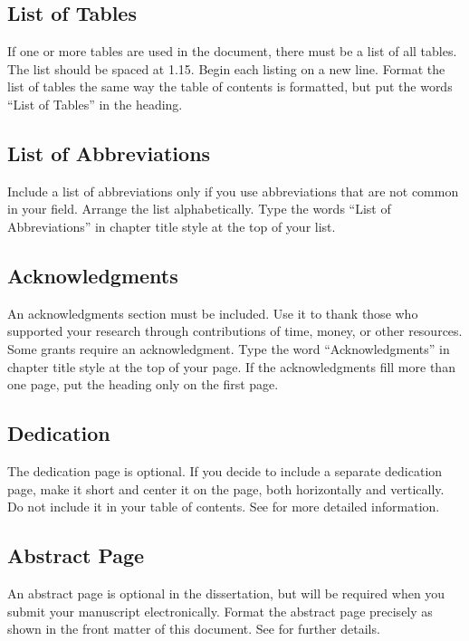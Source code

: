 \subsection{List of Tables}

If one or more tables are used in the document, there must be a list of all tables.
The list should be spaced at 1.15.
Begin each listing on a new line.
Format the list of tables the same way the table of contents is formatted, but put the words ``List of Tables'' in the heading.

\subsection{List of Abbreviations}

Include a list of abbreviations only if you use abbreviations that are not common in your field.
Arrange the list alphabetically.
Type the words ``List of Abbreviations'' in chapter title style at the top of your list.

\subsection{Acknowledgments}

An acknowledgments section must be included.
Use it to thank those who supported your research through contributions of time, money, or other resources.
Some grants require an acknowledgment.
Type the word ``Acknowledgments'' in chapter title style at the top of your page.
If the acknowledgments fill more than one page, put the heading only on the first page.

\subsection{Dedication}

The dedication page is optional.
If you decide to include a separate dedication page, make it short and center it on the page, both horizontally and vertically.
Do not include it in your table of contents.
See  for more detailed information.

\subsection{Abstract Page}

An abstract page is optional in the dissertation, but will be required when you submit your manuscript electronically.
Format the abstract page precisely as shown in the front matter of this document.
See  for further details.

